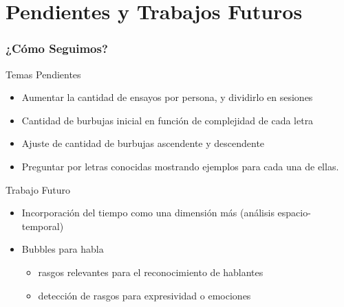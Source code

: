 \documentclass[10pt]{beamer}
\begin{document}
  \section{Pendientes y Trabajos Futuros}
	\begin{frame}
	\frametitle{¿C\'omo Seguimos?}
	  \begin{block}{Temas Pendientes}
	    \begin{itemize}
		\item Aumentar la cantidad de ensayos por persona, y dividirlo en sesiones
		\item Cantidad de burbujas inicial en función de complejidad de cada letra
		\item Ajuste de cantidad de burbujas ascendente y descendente
		\item Preguntar por letras conocidas mostrando ejemplos para cada una de ellas. 
	    \end{itemize}
	  \end{block} \pause

	  \begin{block}{Trabajo Futuro}
	   \begin{itemize}
		\item Incorporación del tiempo como una dimensi\'on más (an\'alisis espacio-temporal)
		\item Bubbles para habla
		    \begin{itemize}
		      \item rasgos relevantes para el reconocimiento de hablantes
		      \item detección de rasgos para expresividad o emociones
		    \end{itemize}
	    \end{itemize}                     
	  \end{block}	    
	\end{frame}

\author[Christian, Miguel, Mail\'en]{Mail\'en G\'omez Mayol,\\Miguel Mart\'inez Soler,\\Christian Cossio Mercado}

\frame{\titlepage}

\appendix
\section{\appendixname}
\end{document}
